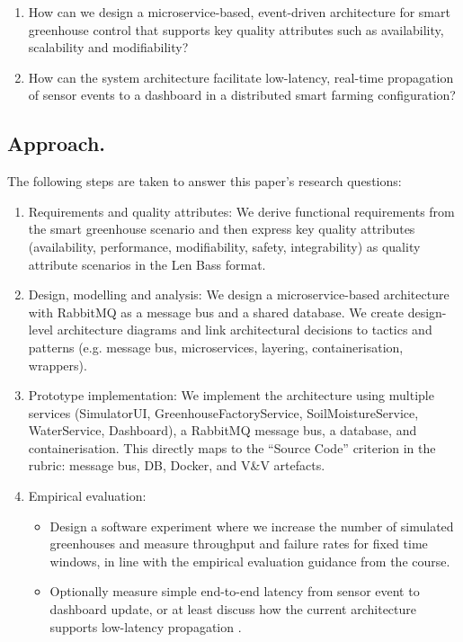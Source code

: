\documentclass[conference]{IEEEtran}
\begin{document}
\begin{enumerate}
    \item  How can we design a microservice-based, event-driven architecture for smart greenhouse control that supports key quality attributes such as availability, scalability and modifiability?

    \item How can the system architecture facilitate low-latency, real-time propagation of sensor events to a dashboard in a distributed smart farming configuration?
\end{enumerate}

\subsection{Approach.}
The following steps are taken to answer this paper's research questions: 
\begin{enumerate}
    \item Requirements and quality attributes: We derive functional requirements from the smart greenhouse scenario and then express key quality attributes (availability, performance, modifiability, safety, integrability) as quality attribute scenarios in the Len Bass format.

    \item Design, modelling and analysis: We design a microservice-based architecture with RabbitMQ as a message bus and a shared database. We create design-level architecture diagrams and link architectural decisions to tactics and patterns (e.g. message bus, microservices, layering, containerisation, wrappers).

    \item Prototype implementation: We implement the architecture using multiple services (SimulatorUI, GreenhouseFactoryService, SoilMoistureService, WaterService, Dashboard), a RabbitMQ message bus, a database, and containerisation. This directly maps to the “Source Code” criterion in the rubric: message bus, DB, Docker, and V\&V artefacts.

    \item Empirical evaluation: 
    \begin{itemize}
        \item Design a software experiment where we increase the number of simulated greenhouses and measure throughput and failure rates for fixed time windows, in line with the empirical evaluation guidance from the course.
        
        \item  Optionally measure simple end-to-end latency from sensor event to dashboard update, or at least discuss how the current architecture supports low-latency propagation .
    \end{itemize}
    

   

\end{enumerate}
\end{document}
